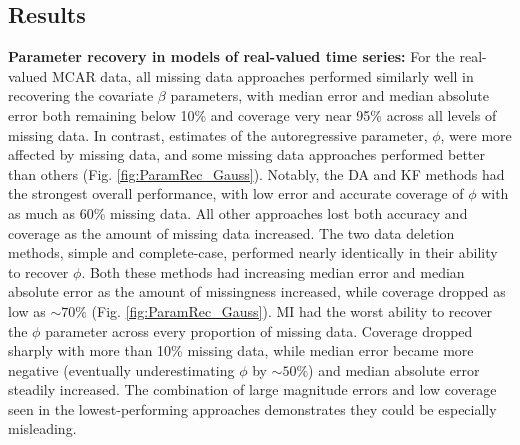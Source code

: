 \documentclass[12pt,english]{article} %
\begin{document}
\begin{linenumbers}
\begin{spacing}{1.9}
\begin{flushleft}
\vspace{-2.5em}
\section*{Results}
\vspace{-1.5em}


\textbf{Parameter recovery in models of real-valued time series:} For the real-valued MCAR data, all missing data approaches performed similarly well in recovering the covariate $\beta$ parameters, with median error and median absolute error both remaining below 10\% and coverage very near 95\% across all levels of missing data. In contrast, estimates of the autoregressive parameter, $\phi$, were more affected by missing data, and some missing data approaches performed better than others (Fig. \ref{fig:ParamRec_Gauss}). Notably, the DA and KF methods had the strongest overall performance, with low error and accurate coverage of $\phi$ with as much as 60\% missing data. All other approaches lost both accuracy and coverage as the amount of missing data increased. The two data deletion methods, simple and complete-case, performed nearly identically in their ability to recover $\phi$. Both these methods had increasing median error and median absolute error as the amount of missingness increased, while coverage dropped as low as $\sim70\%$ (Fig. \ref{fig:ParamRec_Gauss}). MI had the worst ability to recover the $\phi$ parameter across every proportion of missing data. Coverage dropped sharply with more than 10\% missing data, while median error became more negative (eventually underestimating $\phi$ by $\sim50\%$) and median absolute error steadily increased. The combination of large magnitude errors and low coverage seen in the lowest-performing approaches demonstrates they could be especially misleading. 


\end{flushleft}
\end{spacing}
\end{linenumbers}
\end{document}
